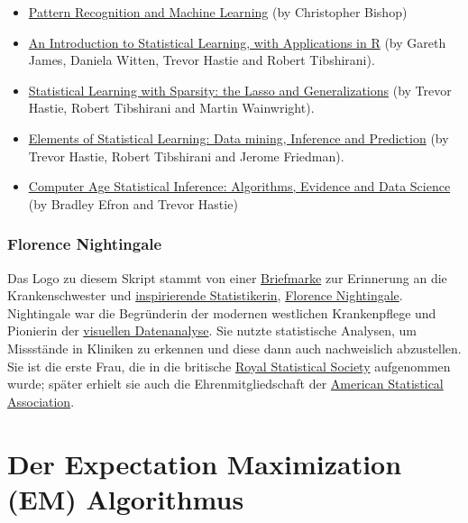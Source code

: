 \documentclass[
  ngerman,
]{book}
\begin{document}
\begin{itemize}
\item
  \href{https://www.microsoft.com/en-us/research/uploads/prod/2006/01/Bishop-Pattern-Recognition-and-Machine-Learning-2006.pdf}{Pattern Recognition and Machine Learning} (by Christopher Bishop)
\item
  \href{https://trevorhastie.github.io/ISLR/}{An Introduction to Statistical Learning, with Applications in R} (by Gareth James, Daniela Witten, Trevor Hastie and Robert Tibshirani).
\item
  \href{https://web.stanford.edu/~hastie/StatLearnSparsity/}{Statistical Learning with Sparsity: the Lasso and Generalizations} (by Trevor Hastie, Robert Tibshirani and Martin Wainwright).
\item
  \href{https://web.stanford.edu/~hastie/ElemStatLearn/}{Elements of Statistical Learning: Data mining, Inference and Prediction} (by Trevor Hastie, Robert Tibshirani and Jerome Friedman).
\item
  \href{https://web.stanford.edu/~hastie/CASI/}{Computer Age Statistical Inference: Algorithms, Evidence and Data Science} (by Bradley Efron and Trevor Hastie)
\end{itemize}

\hypertarget{florence-nightingale}{%
\subsection*{Florence Nightingale}\label{florence-nightingale}}

Das Logo zu diesem Skript stammt von einer \href{https://de.wikipedia.org/wiki/Datei:DBP_1955_225_Florence_Nightingale.jpg}{Briefmarke} zur Erinnerung an die Krankenschwester und \href{https://infowetrust.com/project/designhero}{inspirierende Statistikerin}, \href{https://de.wikipedia.org/wiki/Florence_Nightingale}{Florence Nightingale}. Nightingale war die Begründerin der modernen westlichen Krankenpflege und Pionierin der \href{https://de.wikipedia.org/wiki/Kreisdiagramm\#/media/Datei:Nightingale-mortality.jpg}{visuellen Datenanalyse}. Sie nutzte statistische Analysen, um Missstände in Kliniken zu erkennen und diese dann auch nachweislich abzustellen. Sie ist die erste Frau, die in die britische \href{https://rss.org.uk/}{Royal Statistical Society} aufgenommen wurde; später erhielt sie auch die Ehrenmitgliedschaft der \href{https://www.amstat.org/}{American Statistical Association}.

\hypertarget{der-expectation-maximization-em-algorithmus}{%
\chapter{Der Expectation Maximization (EM) Algorithmus}\label{der-expectation-maximization-em-algorithmus}}
\end{document}

